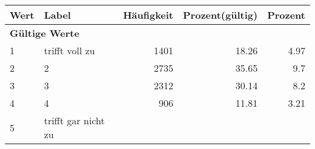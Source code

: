      \begin{longtable}{lXrrr}
     \toprule
     \textbf{Wert} & \textbf{Label} & \textbf{Häufigkeit} & \textbf{Prozent(gültig)} & \textbf{Prozent} \\
     \endhead
     \midrule
     \multicolumn{5}{l}{\textbf{Gültige Werte}}\\

     1 &
     \multicolumn{1}{X}{ trifft voll zu   } &


       \num{1401} &
       \num[round-mode=places,round-precision=2]{18.26} &
         \num[round-mode=places,round-precision=2]{4.97} \\

     2 &
     \multicolumn{1}{X}{ 2   } &


       \num{2735} &
       \num[round-mode=places,round-precision=2]{35.65} &
         \num[round-mode=places,round-precision=2]{9.7} \\

     3 &
     \multicolumn{1}{X}{ 3   } &


       \num{2312} &
       \num[round-mode=places,round-precision=2]{30.14} &
         \num[round-mode=places,round-precision=2]{8.2} \\

     4 &
     \multicolumn{1}{X}{ 4   } &


       \num{906} &
       \num[round-mode=places,round-precision=2]{11.81} &
         \num[round-mode=places,round-precision=2]{3.21} \\

     5 &
     \multicolumn{1}{X}{ trifft gar nicht zu   } &



\end{longtable}
